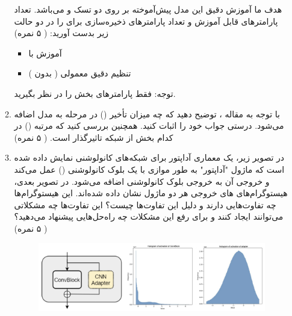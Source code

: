 \documentclass[12pt]{article}
\begin{document}
\begin{enumerate}
\begin{enumerate}
        هدف ما آموزش دقیق این مدل پیش‌آموخته بر روی دو تسک  و  می‌باشد.
        تعداد پارامترهای قابل آموزش و تعداد پارامترهای ذخیره‌سازی برای  را در دو حالت زیر بدست آورید: ( ۵ نمره) 
        \begin{itemize}
            \item آموزش با  
            \item تنظیم دقیق معمولی ( بدون ) 
        \end{itemize}
        توجه: فقط پارامترهای بخش  را در نظر بگیرید.
        \item با توجه به مقاله ، توضیح دهید که چه میزان تأخیر () در مرحله  به مدل اضافه می‌شود. درستی جواب خود را اثبات کنید. همچنین بررسی کنید که مرتبه () در کدام بخش از شبکه تاثیرگذار است. ( ۵ نمره)
        \item در تصویر زیر، یک معماری آداپتور برای شبکه‌های کانولوشنی نمایش داده شده است که ماژول "آداپتور" به‌ طور موازی با یک بلوک کانولوشنی () عمل می‌کند و خروجی آن به خروجی بلوک کانولوشنی اضافه می‌شود. در تصویر بعدی، هیستوگرام‌های  های خروجی هر دو ماژول نشان داده شده‌اند. این هیستوگرام‌ها چه تفاوت‌هایی دارند و دلیل این تفاوت‌ها چیست؟ این تفاوت‌ها چه مشکلاتی می‌توانند ایجاد کنند و برای رفع این مشکلات چه راه‌حل‌هایی پیشنهاد می‌دهید؟ ( ۵ نمره)
        \begin{figure}[h]
        \centering
        \includegraphics[width=\textwidth]{figs/Q2_4.png}
        \label{fig:q4}  
    \end{figure}
    \end{enumerate}


\end{enumerate}
\end{document}
